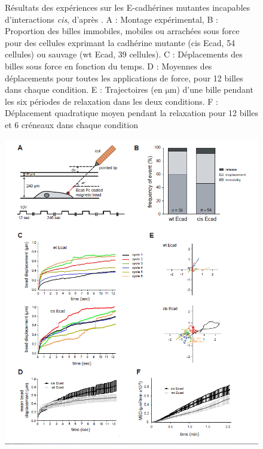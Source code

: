 \documentclass{report}
\newcommand{\micro}{$\mathrm{\mu}$}
\begin{document}
 \begin{figure}[h!]
\caption{\small Résultats des expériences sur les E-cadhérines mutantes incapables d'interactions \textit{cis}, d'après \cite{Strale}. A : Montage expérimental, B : Proportion des billes immobiles, mobiles ou arrachées sous force pour des cellules exprimant la cadhérine mutante (cis Ecad, 54 cellules) ou sauvage (wt Ecad, 39 cellules). C : Déplacements des billes sous force en fonction du temps. D : Moyennes des déplacements pour toutes les applications de force, pour 12 billes dans chaque condition. E : Trajectoires (en \micro m) d'une bille pendant les six périodes de relaxation dans les deux conditions. F : Déplacement quadratique moyen pendant la relaxation pour 12 billes et 6 créneaux dans chaque condition}
\end{figure} 
     
 \begin{figure}
 \includegraphics[scale=0.7]{Figures/Strale.png} 

 \end{figure}


 
 
 
 
\end{document}
